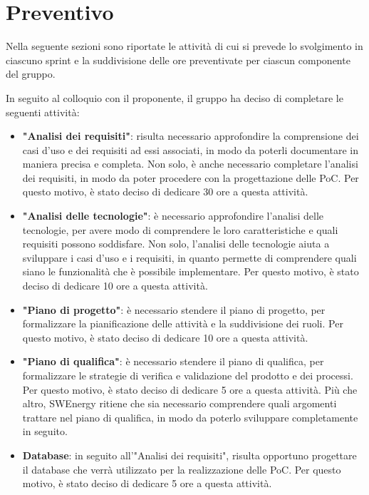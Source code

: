 \section{Preventivo}

Nella seguente sezioni sono riportate le attività di cui si prevede lo
svolgimento in ciascuno sprint e la suddivisione delle ore preventivate per
ciascun componente del gruppo.


In seguito al colloquio con il proponente, il gruppo ha deciso di completare le
seguenti attività:

\begin{itemize}
	\item \textbf{"Analisi dei requisiti"}: risulta necessario approfondire la
	      comprensione dei casi d'uso e dei requisiti ad essi associati, in modo da
	      poterli documentare in maniera precisa e completa. Non solo, è anche necessario
	      completare l'analisi dei requisiti, in modo da poter procedere con la
	      progettazione delle PoC. Per questo motivo, è stato deciso di dedicare 30 ore a
	      questa attività.

	\item \textbf{"Analisi delle tecnologie"}: è necessario approfondire l'analisi
	      delle tecnologie, per avere modo di comprendere le loro caratteristiche e quali
	      requisiti possono soddisfare. Non solo, l'analisi delle tecnologie aiuta a
	      sviluppare i casi d'uso e i requisiti, in quanto permette di comprendere quali
	      siano le funzionalità che è possibile implementare. Per questo motivo, è stato
	      deciso di dedicare 10 ore a questa attività.

	\item \textbf{"Piano di progetto"}: è necessario stendere il piano di progetto,
	      per formalizzare la pianificazione delle attività e la suddivisione dei ruoli.
	      Per questo motivo, è stato deciso di dedicare 10 ore a questa attività.

	\item \textbf{"Piano di qualifica"}: è necessario stendere il piano di
	      qualifica, per formalizzare le strategie di verifica e validazione del prodotto
	      e dei processi. Per questo motivo, è stato deciso di dedicare 5 ore a questa
	      attività. Più che altro, SWEnergy ritiene che sia necessario comprendere quali
	      argomenti trattare nel piano di qualifica, in modo da poterlo sviluppare
	      completamente in seguito.

	\item \textbf{Database}: in seguito all'"Analisi dei requisiti", risulta
	      opportuno progettare il database che verrà utilizzato per la realizzazione delle
	      PoC. Per questo motivo, è stato deciso di dedicare 5 ore a questa attività.
\end{itemize}

